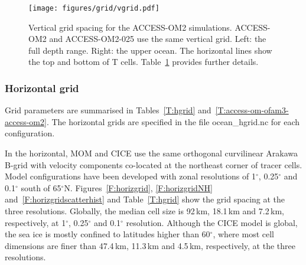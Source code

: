 \documentclass[11pt, a4paper]{article}
\newcommand{\paramsty}[1]{\textsf{#1}}
\newcommand{\param}[1]{\paramsty{#1}\index{\paramsty{#1}}}
\begin{document}
\begin{figure}[htp]
\texttt{[image: figures/grid/vgrid.pdf]}
\caption[Vertical grid spacing for the ACCESS-OM2 simulations.]{Vertical grid spacing for the ACCESS-OM2 simulations. 
ACCESS-OM2 and ACCESS-OM2-025 use the same vertical grid.
Left: the full depth range. 
Right: the upper ocean. 
The horizontal lines show the top and bottom of T cells.
Table~\ref{F:vgrid} provides further details.}
\label{F:vgrid}
\end{figure}

\pagebreak %
\subsubsection{Horizontal grid}\label{S:horizgrid}

Grid parameters are summarised in Tables~\ref{T:hgrid} and~\ref{T:access-om-ofam3-access-om2}.
The horizontal grids are specified in the file \param{ocean_hgrid.nc} for each configuration.

In the horizontal, MOM and CICE use the same orthogonal curvilinear Arakawa B-grid with velocity components co-located at the northeast corner of tracer cells. 
Model configurations have been developed with zonal resolutions of 1$^\circ$, 0.25$^\circ$ and 0.1$^\circ$ south of 65$^\circ$N.
Figures~\ref{F:horizgrid}, \ref{F:horizgridNH} and~\ref{F:horizgridscatterhist} and Table~\ref{T:hgrid} show the grid spacing at the three resolutions.
Globally, the median cell size is 92\,km, 18.1\,km and 7.2\,km, respectively, at 1$^\circ$, 0.25$^\circ$ and 0.1$^\circ$ resolution.
Although the CICE model is global, the sea ice is mostly confined to latitudes higher than 60$^\circ$, where most cell dimensions are finer than 47.4\,km, 11.3\,km and 4.5\,km, respectively, at the three resolutions.
\end{document}
